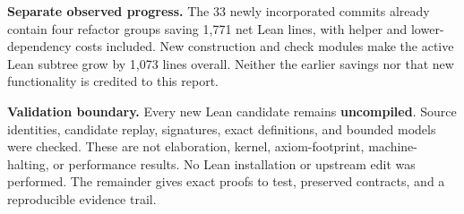 \textbf{Separate observed progress.} The 33 newly incorporated commits already contain four refactor groups saving 1,771 net Lean lines, with helper and lower-dependency costs included. New construction and check modules make the active Lean subtree grow by 1,073 lines overall. Neither the earlier savings nor that new functionality is credited to this report.

\textbf{Validation boundary.} Every new Lean candidate remains \textbf{uncompiled}. Source identities, candidate replay, signatures, exact definitions, and bounded models were checked. These are not elaboration, kernel, axiom-footprint, machine-halting, or performance results. No Lean installation or upstream edit was performed. The remainder gives exact proofs to test, preserved contracts, and a reproducible evidence trail.
